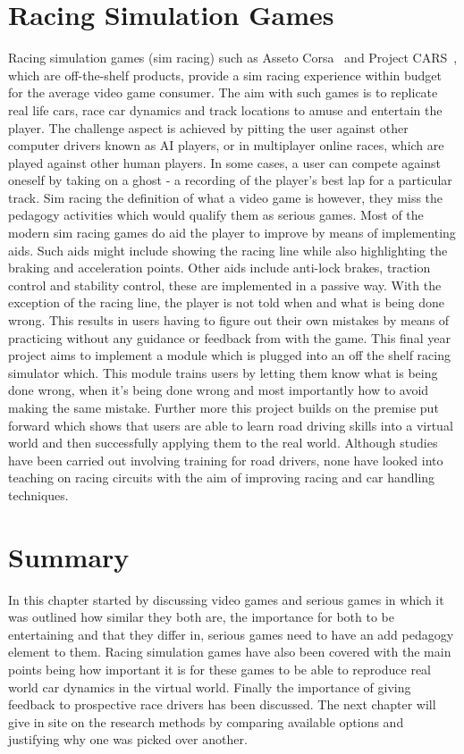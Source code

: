 \section{Racing Simulation Games}
Racing simulation games (sim racing) such as Asseto Corsa~\cite{assestoCorsa} and Project CARS~\cite{ProjectCars}, which are off-the-shelf products, provide a sim racing experience within budget for the average video game consumer. The aim with such games is to replicate real life cars, race car dynamics and track locations to amuse and entertain the player. The challenge aspect is achieved by pitting the user against other computer drivers known as AI players, or in multiplayer online races, which are played against other human players. In some cases, a user can compete against oneself by taking on a ghost - a recording of the player's best lap for a particular track. Sim racing the definition of what a video game is however, they miss the pedagogy activities which would qualify them as serious games. Most of the modern sim racing games do aid the player to improve by means of implementing aids. Such aids might include showing the racing line while also highlighting the braking and acceleration points. Other aids include anti-lock brakes, traction control and stability control, these are implemented in a passive way. With the exception of the racing line, the player is not told when and what is being done wrong. This results in users having to figure out their own mistakes by means of practicing without any guidance or feedback from with the game. This final year project aims to implement a module which is plugged into an off the shelf racing simulator which. This module trains users by letting them know what is being done wrong, when it's being done wrong and most importantly how to avoid making the same mistake. Further more this project builds on the premise put forward which shows that users are able to learn road driving skills into a virtual world and then successfully applying them to the real world\cite{li2015can}\cite{vogel2006computer}. Although studies have been carried out involving training for road drivers, none have looked into teaching on racing circuits with the aim of improving racing and car handling techniques.

\section{Summary}
In this chapter started by discussing video games and serious games in which it was outlined how similar they both are, the importance for both to be entertaining and that they differ in, serious games need to have an add pedagogy element to them. Racing simulation games have also been covered with the main points being how important it is for these games to be able to reproduce real world car dynamics in the virtual world. Finally the importance of giving feedback to prospective race drivers has been discussed. The next chapter will give in site on the research methods by comparing available options and justifying why one was picked over another.